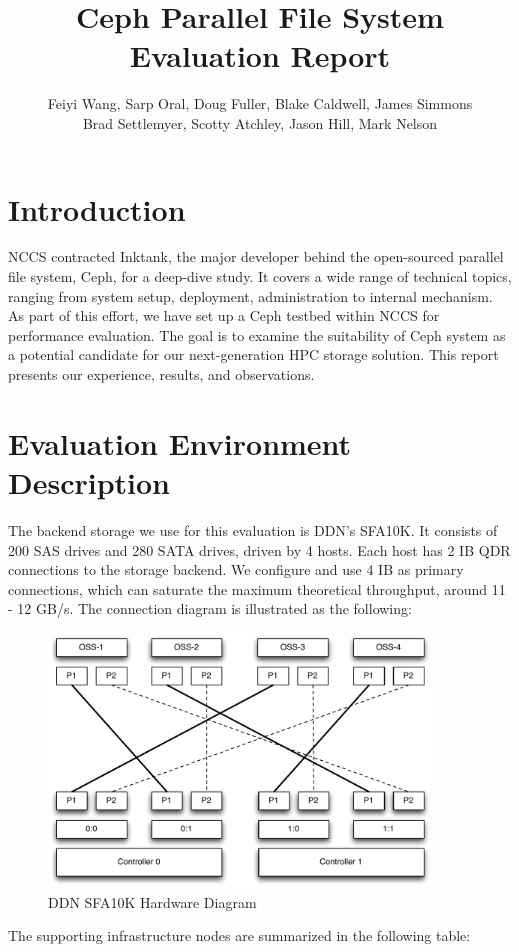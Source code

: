 \documentclass{article}
\title{Ceph Parallel File System Evaluation Report}
\author{Feiyi Wang, Sarp Oral, Doug Fuller, Blake Caldwell, James Simmons\\
Brad Settlemyer, Scotty Atchley, Jason Hill, Mark Nelson}
\begin{document}
\maketitle

\section{Introduction}

NCCS contracted Inktank, the major developer behind the open-sourced parallel
file system, Ceph, for a deep-dive study. It covers a wide range of technical
topics, ranging from system setup, deployment, administration to internal
mechanism. As part of this effort, we have set up a Ceph testbed within NCCS
for performance evaluation. The goal is to examine the suitability of Ceph
system as a potential candidate for our next-generation HPC storage solution.
This report presents our experience, results, and observations.

\section{Evaluation Environment Description}

The backend storage we use for this evaluation is DDN's SFA10K. It consists of
200 SAS drives and 280 SATA drives, driven by 4 hosts. Each host has
2 IB QDR connections to the storage backend. We configure and use 4 IB as
primary connections, which can saturate the maximum theoretical throughput,
around 11 - 12 GB/s. The connection diagram is illustrated as the following:

\begin{figure}[htb]
\centering
\includegraphics[width=4in]{figs/sfa10k}
\caption{DDN SFA10K Hardware Diagram}
\end{figure}


The supporting infrastructure nodes are summarized in the following table:
\end{document}
